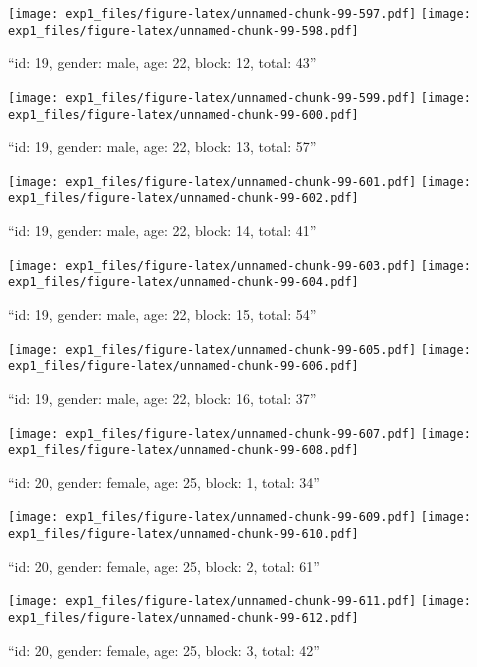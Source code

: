 \documentclass[,]{article}
\begin{document}
\texttt{[image: exp1\_files/figure-latex/unnamed-chunk-99-597.pdf]}
\texttt{[image: exp1\_files/figure-latex/unnamed-chunk-99-598.pdf]}

\newpage
[1] 

``id: 19, gender: male, age: 22, block: 12, total: 43''

\texttt{[image: exp1\_files/figure-latex/unnamed-chunk-99-599.pdf]}
\texttt{[image: exp1\_files/figure-latex/unnamed-chunk-99-600.pdf]}

\newpage
[1] 

``id: 19, gender: male, age: 22, block: 13, total: 57''

\texttt{[image: exp1\_files/figure-latex/unnamed-chunk-99-601.pdf]}
\texttt{[image: exp1\_files/figure-latex/unnamed-chunk-99-602.pdf]}

\newpage
[1] 

``id: 19, gender: male, age: 22, block: 14, total: 41''

\texttt{[image: exp1\_files/figure-latex/unnamed-chunk-99-603.pdf]}
\texttt{[image: exp1\_files/figure-latex/unnamed-chunk-99-604.pdf]}

\newpage
[1] 

``id: 19, gender: male, age: 22, block: 15, total: 54''

\texttt{[image: exp1\_files/figure-latex/unnamed-chunk-99-605.pdf]}
\texttt{[image: exp1\_files/figure-latex/unnamed-chunk-99-606.pdf]}

\newpage
[1] 

``id: 19, gender: male, age: 22, block: 16, total: 37''

\texttt{[image: exp1\_files/figure-latex/unnamed-chunk-99-607.pdf]}
\texttt{[image: exp1\_files/figure-latex/unnamed-chunk-99-608.pdf]}

\newpage
[1] 

``id: 20, gender: female, age: 25, block: 1, total: 34''

\texttt{[image: exp1\_files/figure-latex/unnamed-chunk-99-609.pdf]}
\texttt{[image: exp1\_files/figure-latex/unnamed-chunk-99-610.pdf]}

\newpage
[1] 

``id: 20, gender: female, age: 25, block: 2, total: 61''

\texttt{[image: exp1\_files/figure-latex/unnamed-chunk-99-611.pdf]}
\texttt{[image: exp1\_files/figure-latex/unnamed-chunk-99-612.pdf]}

\newpage
[1] 

``id: 20, gender: female, age: 25, block: 3, total: 42''
\end{document}
